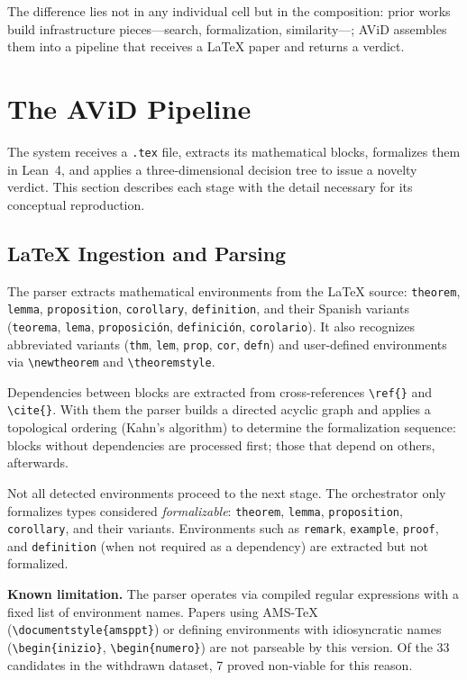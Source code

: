 \documentclass[12pt,a4paper]{article}
\theoremstyle{remark}
\begin{document}
The difference lies not in any individual cell but in the composition: prior works build infrastructure pieces---search, formalization, similarity---; AViD assembles them into a pipeline that receives a LaTeX paper and returns a verdict.


\section{The AViD Pipeline}

\label{sec:pipeline}

The system receives a \texttt{.tex} file, extracts its mathematical blocks, formalizes them in Lean~4, and applies a three-dimensional decision tree to issue a novelty verdict. This section describes each stage with the detail necessary for its conceptual reproduction.

\subsection{LaTeX Ingestion and Parsing}

The parser extracts mathematical environments from the LaTeX source: \texttt{theorem}, \texttt{lemma}, \texttt{proposition}, \texttt{corollary}, \texttt{definition}, and their Spanish variants (\texttt{teorema}, \texttt{lema}, \texttt{proposición}, \texttt{definición}, \texttt{corolario}). It also recognizes abbreviated variants (\texttt{thm}, \texttt{lem}, \texttt{prop}, \texttt{cor}, \texttt{defn}) and user-defined environments via \verb|\newtheorem| and \verb|\theoremstyle|.

Dependencies between blocks are extracted from cross-references \verb|\ref{}| and \verb|\cite{}|. With them the parser builds a directed acyclic graph and applies a topological ordering (Kahn's algorithm) to determine the formalization sequence: blocks without dependencies are processed first; those that depend on others, afterwards.

Not all detected environments proceed to the next stage. The orchestrator only formalizes types considered \textit{formalizable}: \texttt{theorem}, \texttt{lemma}, \texttt{proposition}, \texttt{corollary}, and their variants. Environments such as \texttt{remark}, \texttt{example}, \texttt{proof}, and \texttt{definition} (when not required as a dependency) are extracted but not formalized.

\textbf{Known limitation.} The parser operates via compiled regular expressions with a fixed list of environment names. Papers using AMS-\TeX{} (\verb|\documentstyle{amsppt}|) or defining environments with idiosyncratic names (\verb|\begin{inizio}|, \verb|\begin{numero}|) are not parseable by this version. Of the 33 candidates in the withdrawn dataset, 7 proved non-viable for this reason.
\end{document}
